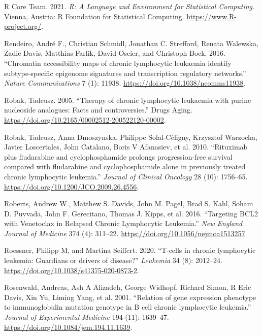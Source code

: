\documentclass[11pt, a4paper, twosided]{book}
\newenvironment{CSLReferences}%
  {}%
  {\par}
\begin{document}
\begin{CSLReferences}{1}{0}
\leavevmode{}%
R Core Team. 2021. \emph{R: A Language and Environment for Statistical Computing}. Vienna, Austria: R Foundation for Statistical Computing. \url{https://www.R-project.org/}.

\leavevmode{}%
Rendeiro, André F., Christian Schmidl, Jonathan C. Strefford, Renata Walewska, Zadie Davis, Matthias Farlik, David Oscier, and Christoph Bock. 2016. {``{Chromatin accessibility maps of chronic lymphocytic leukaemia identify subtype-specific epigenome signatures and transcription regulatory networks}.''} \emph{Nature Communications} 7 (1): 11938. \url{https://doi.org/10.1038/ncomms11938}.

\leavevmode{}%
Robak, Tadeusz. 2005. {``{Therapy of chronic lymphocytic leukaemia with purine nucleoside analogues: Facts and controversies}.''} Drugs Aging. \url{https://doi.org/10.2165/00002512-200522120-00002}.

\leavevmode{}%
Robak, Tadeusz, Anna Dmoszynska, Philippe Solal-Céligny, Krzysztof Warzocha, Javier Loscertales, John Catalano, Boris V Afanasiev, et al. 2010. {``{Rituximab plus fludarabine and cyclophosphamide prolongs progression-free survival compared with fludarabine and cyclophosphamide alone in previously treated chronic lymphocytic leukemia}.''} \emph{Journal of Clinical Oncology} 28 (10): 1756--65. \url{https://doi.org/10.1200/JCO.2009.26.4556}.

\leavevmode{}%
Roberts, Andrew W., Matthew S. Davids, John M. Pagel, Brad S. Kahl, Soham D. Puvvada, John F. Gerecitano, Thomas J. Kipps, et al. 2016. {``{Targeting BCL2 with Venetoclax in Relapsed Chronic Lymphocytic Leukemia}.''} \emph{New England Journal of Medicine} 374 (4): 311--22. \url{https://doi.org/10.1056/nejmoa1513257}.

\leavevmode{}%
Roessner, Philipp M, and Martina Seiffert. 2020. {``{T-cells in chronic lymphocytic leukemia: Guardians or drivers of disease?}''} \emph{Leukemia} 34 (8): 2012--24. \url{https://doi.org/10.1038/s41375-020-0873-2}.

\leavevmode{}%
Rosenwald, Andreas, Ash A Alizadeh, George Widhopf, Richard Simon, R Eric Davis, Xin Yu, Liming Yang, et al. 2001. {``{Relation of gene expression phenotype to immunoglobulin mutation genotype in B cell chronic lymphocytic leukemia}.''} \emph{Journal of Experimental Medicine} 194 (11): 1639--47. \url{https://doi.org/10.1084/jem.194.11.1639}.


\end{CSLReferences}
\end{document}
